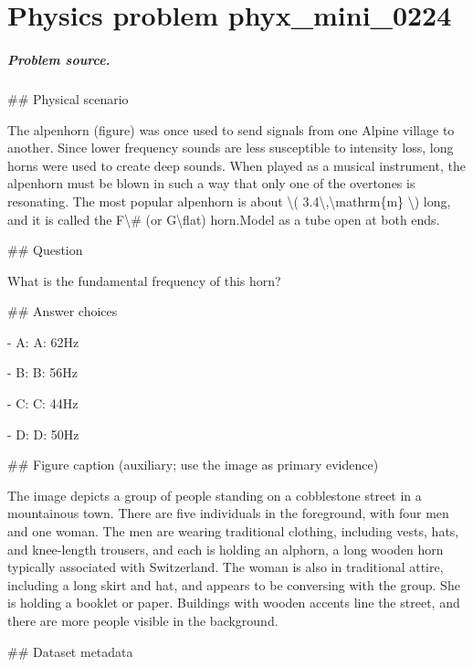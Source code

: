 
\chapter{Physics problem phyx\_mini\_0224}
\label{ch:PhyXMiniProblems_problem_phyx_mini_0224}

\paragraph{Problem source.}
\#\# Physical scenario

The alpenhorn (figure) was once used to send signals from one Alpine village to another. Since lower frequency sounds are less susceptible to intensity loss, long horns were used to create deep sounds. When played as a musical instrument, the alpenhorn must be blown in such a way that only one of the overtones is resonating. The most popular alpenhorn is about \textbackslash{}( 3.4\textbackslash{},\textbackslash{}mathrm\{m\} \textbackslash{}) long, and it is called the F\textbackslash{}\# (or G\textbackslash{}flat) horn.Model as a tube open at both ends.

\#\# Question

What is the fundamental frequency of this horn?

\#\# Answer choices

- A: A: 62Hz

- B: B: 56Hz

- C: C: 44Hz

- D: D: 50Hz

\#\# Figure caption (auxiliary; use the image as primary evidence)

The image depicts a group of people standing on a cobblestone street in a mountainous town. There are five individuals in the foreground, with four men and one woman. The men are wearing traditional clothing, including vests, hats, and knee-length trousers, and each is holding an alphorn, a long wooden horn typically associated with Switzerland. The woman is also in traditional attire, including a long skirt and hat, and appears to be conversing with the group. She is holding a booklet or paper. Buildings with wooden accents line the street, and there are more people visible in the background.

\#\# Dataset metadata

